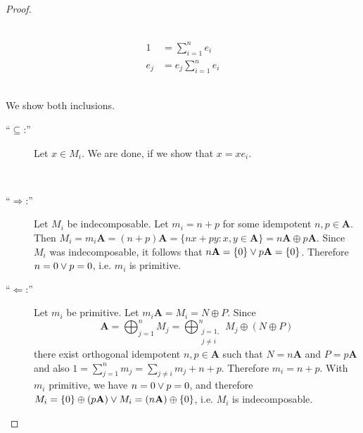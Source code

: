 \begin{proof}[Proof\nopunct]
\begin{subproof}
\phantom{}\\
\begin{align}
1 &= \sum_{i=1}^{n} e_{i}\\
e_{j} &= e_{j}\sum_{i=1}^{n} e_{i}
\end{align}

\end{subproof}
\begin{subproof}[Proof that $M_{i} = \mathbf{A}e_{i}$]\phantom{}\\
We show both inclusions.
\begin{description}
\item[``$\subseteq$:''] Let $x \in M_{i}$. We are done, if we show that $x = xe_{i}$.
\end{description}
\end{subproof}
\begin{subproof}\phantom{}\\
\begin{description}
\item[``$\Rightarrow$:''] Let $M_{i}$ be indecomposable. Let $m_{i} = n + p$ for some idempotent $n, p \in \mathbf{A}$. Then
$M_{i} = m_{i}\mathbf{A} = (n+p)\mathbf{A} = \{nx + py : x,y \in \mathbf{A}\} = n\mathbf{A} \oplus p\mathbf{A}$. Since $M_{i}$ was
indecomposable, it follows that $n\mathbf{A} = \{0\} \vee p\mathbf{A} = \{0\}$. Therefore $n = 0 \vee p = 0$, i.e. $m_{i}$ is primitive.

\item[``$\Leftarrow$:''] Let $m_{i}$ be primitive. Let $m_{i}\mathbf{A} = M_{i} = N \oplus P$. Since
\[
\mathbf{A} = \bigoplus_{j=1}^{n} M_{j} = \bigoplus_{\begin{smallmatrix}j=1,\\ j \neq i\end{smallmatrix}}^{n} M_{j} \oplus (N \oplus P)
\]
there exist orthogonal idempotent $n, p \in \mathbf{A}$ such that $N = n\mathbf{A}$ and $P = p\mathbf{A}$ and also
$1 = \sum_{j=1}^{n} m_{j} = \sum_{j\neq i} m_{j} + n + p$. Therefore $m_{i} = n + p$. With $m_{i}$ primitive, we have
$n = 0 \vee p = 0$, and therefore $M_{i} = \{0\} \oplus (p\mathbf{A}) \vee M_{i} = (n\mathbf{A}) \oplus \{0\}$, i.e. $M_{i}$ is indecomposable.
\end{description}
\end{subproof}
\end{proof}

